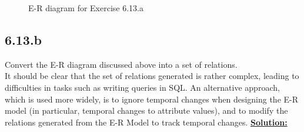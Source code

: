 \documentclass[12pt,a4paper]{article}
\begin{document}
\begin{figure}[h]

\caption{E-R diagram for Exercise 6.13.a}
\label{fig:temporal_er}
\end{figure}

\subsection*{6.13.b}Convert the E-R diagram discussed above into a set of relations. \\
It should be clear that the set of relations generated is rather complex, leading to difficulties in tasks such as writing queries in SQL. An alternative approach, which is used more widely, is to ignore temporal changes when designing the E-R model (in particular, temporal changes to attribute values), and to modify the relations generated from the E-R Model to track temporal changes.
\newpage
\textbf{\underline{Solution:}}
\end{document}
